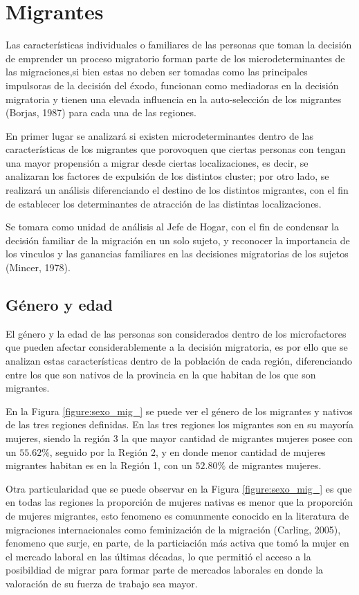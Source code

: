 \documentclass[12pt,a4paper]{article}
\begin{document}
\section{Migrantes}
Las características individuales o familiares de las personas que toman la decisión de emprender un proceso migratorio forman parte de los microdeterminantes de las migraciones,si bien estas no deben ser tomadas como las principales impulsoras de la decisión del éxodo, funcionan como mediadoras en la decisión migratoria y tienen una elevada influencia en la auto-selección de los migrantes (Borjas, 1987) para cada una de las regiones.

En primer lugar se analizará si existen microdeterminantes dentro de las características de los migrantes que porovoquen que ciertas personas con tengan una mayor propensión a migrar desde ciertas localizaciones, es decir, se analizaran los factores de expulsión de los distintos cluster; por otro lado, se realizará un análisis diferenciando el destino de los distintos migrantes, con el fin de establecer los determinantes de atracción de las distintas localizaciones.

Se tomara como unidad de análisis al Jefe de Hogar, con el fin de condensar la decisión familiar de la migración en un solo sujeto, y reconocer la importancia de los vinculos y las ganancias familiares en las decisiones migratorias de los sujetos (Mincer, 1978).

\subsection{Género y edad}
El género y la edad de las personas son considerados dentro de los microfactores que pueden afectar considerablemente a la decisión migratoria, es por ello que se analizan estas características dentro de la población de cada región, diferenciando entre los que son nativos de la provincia en la que habitan de los que son migrantes.

En la Figura \ref{figure:sexo_mig_} se puede ver el género de los migrantes y nativos de las tres regiones definidas. En las tres regiones los migrantes  son en su mayoría mujeres, siendo la región 3 la que mayor cantidad de migrantes mujeres posee con un $55.62\%$, seguido por la Región 2, y en donde menor cantidad de mujeres migrantes habitan es en la Región 1, con un $52.80\%$ de migrantes mujeres.

Otra particularidad que se puede observar en la Figura \ref{figure:sexo_mig_} es que en todas las regiones la proporción de mujeres nativas es menor que la proporción de mujeres migrantes, esto fenomeno es comunmente conocido en la literatura de migraciones internacionales como feminización de la migración (Carling, 2005), fenomeno que surje, en parte, de la particiación más activa que tomó la mujer en el mercado laboral en las últimas décadas, lo que permitió el acceso a la posibildiad de migrar para formar parte de mercados laborales en donde la valoración de su fuerza de trabajo sea mayor.
\end{document}
